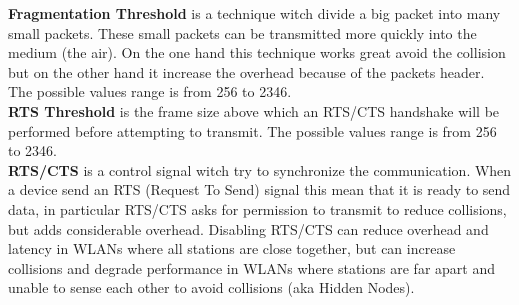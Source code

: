 	\textbf{Fragmentation Threshold} is a technique witch divide a big packet into many small packets. These small packets can be transmitted more quickly into the medium (the air). On the one hand this technique works great avoid the collision but on the other hand it increase the overhead because of the packets header. The possible values range is from 256 to 2346.\\
	
	\textbf{RTS Threshold} is the frame size above which an RTS/CTS handshake will be performed before attempting to transmit. The possible values range is from 256 to 2346.\\
	
	\textbf{RTS/CTS} is a control signal witch try to synchronize the communication. When a device send an RTS (Request To Send) signal this mean that it is ready to send data, in particular RTS/CTS asks for permission to transmit to reduce collisions, but adds considerable overhead. Disabling RTS/CTS can reduce overhead and latency in WLANs where all stations are close together, but can increase collisions and degrade performance in WLANs where stations are far apart and unable to sense each other to avoid collisions (aka Hidden Nodes).


	








